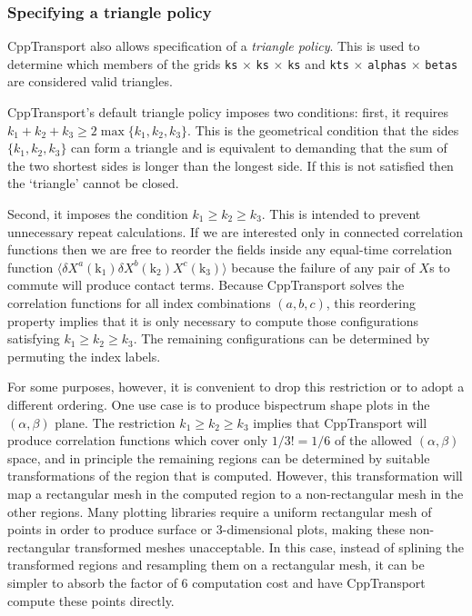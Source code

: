 \documentclass[11pt,a4paper]{article}
\newcommand{\vect}[1]{\bm{\mathrm{{#1}}}}
\newcommand{\packagefont}{\sffamily}
\newcommand{\CppTransport}{{\packagefont CppTransport}}
\renewcommand{\geq}{\geqslant}
\begin{document}
\subsubsection{Specifying a triangle policy}
\label{sec:triangle-policy}
{\CppTransport} also allows specification of a \emph{triangle policy}.
This is used to determine which members of the grids
\texttt{ks} $\times$ \texttt{ks} $\times$ \texttt{ks}
and
\texttt{kts} $\times$ \texttt{alphas} $\times$ \texttt{betas}
are considered valid triangles.

{\CppTransport}'s default triangle policy imposes two conditions: first,
it requires $k_1 + k_2 + k_3 \geq 2 \max \{ k_1, k_2, k_3 \}$.
This is the geometrical condition that the sides
$\{ k_1, k_2, k_3 \}$ can form a triangle
and is equivalent to demanding that the sum of the two shortest sides is longer than the
longest side.
If this is not satisfied then the `triangle' cannot be closed.

Second, it imposes the condition
$k_1 \geq k_2 \geq k_3$.
This is intended to prevent unnecessary repeat calculations.
If we are interested only in connected correlation functions
then we are free to reorder the fields inside any
equal-time
correlation function
$\langle \delta X^a(\vect{k}_1) \delta X^b(\vect{k}_2) X^c(\vect{k}_3) \rangle$
because the failure of any pair of $X$s to commute will produce
contact terms.
Because {\CppTransport} solves the correlation functions for
all index combinations $(a,b,c)$, this reordering property
implies that it is only necessary to compute those configurations
satisfying $k_1 \geq k_2 \geq k_3$.
The remaining configurations can be determined by
permuting the index labels.

For some purposes, however, it is convenient to drop this restriction
or to adopt a different ordering. One use case is to produce
bispectrum shape plots in the $(\alpha, \beta)$ plane.
The restriction $k_1 \geq k_2 \geq k_3$ implies that
{\CppTransport} will produce correlation functions which cover only
$1/3! = 1/6$ of the allowed $(\alpha, \beta)$ space,
and in principle the remaining
regions can be determined by suitable transformations
of the region that is computed.
However, this transformation will map a rectangular mesh
in the computed region
to a non-rectangular mesh in the other regions.
Many plotting libraries require a uniform rectangular mesh
of points in order to produce surface or 3-dimensional plots,
making these non-rectangular transformed meshes unacceptable.
In this case, instead of splining the transformed regions and resampling
them on a rectangular mesh, it can be simpler
to absorb the factor of 6 computation cost and have
{\CppTransport} compute these points directly.
\end{document}
